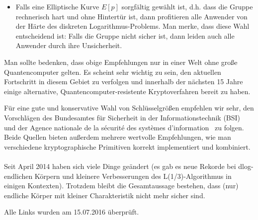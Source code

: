 \begin{refsegment}
\begin{itemize}
\item Falls eine Elliptische Kurve $E[p]$ sorgfältig gewählt ist, d.h. dass die Gruppe rechnerisch hart und ohne Hintertür ist, dann profitieren alle Anwender von der Härte des diskreten Logarithmus-Problems. Man merke, dass diese Wahl entscheidend ist: Falls die Gruppe nicht sicher ist, dann leiden auch alle Anwender durch ihre Unsicherheit.
\end{itemize}

 Man sollte bedenken, dass obige Empfehlungen nur in einer Welt ohne große Quantencomputer gelten.
 Es scheint sehr wichtig zu sein, den aktuellen Fortschritt in diesem Gebiet zu verfolgen und innerhalb der nächsten 15 Jahre einige alternative, Quantencomputer-resistente Kryptoverfahren bereit zu haben.

Für eine gute und konservative Wahl von Schlüsselgrößen empfehlen wir sehr, den Vorschlägen des Bundesamtes f\"ur Sicherheit in der Informationstechnik (BSI)~\cite{BSI2012} und der Agence nationale de la s\'ecurit\'e des syst\`emes d'informa\-tion~\cite{refanssi2013} zu folgen. Beide Quellen bieten außerdem mehrere wertvolle Empfehlungen, wie man verschiedene kryptographische Primitiven korrekt implementiert und kombiniert.\\\\

Seit April 2014 haben sich viele Dinge geändert (es gab es neue Rekorde bei dlog-endlichen Körpern und kleinere Verbesserungen des L(1/3)-Algorithmus in einigen Kontexten). Trotzdem bleibt die Gesamtaussage bestehen, dass (nur) endliche Körper mit kleiner Charakteristik nicht mehr sicher sind.



\printbibliography[%
	heading=subbibintoc,
	title={Literatur zu Kapitel \thechapter},
	segment=\therefsegment,
]
\end{refsegment}


\noindent Alle Links wurden am 15.07.2016 überprüft.


